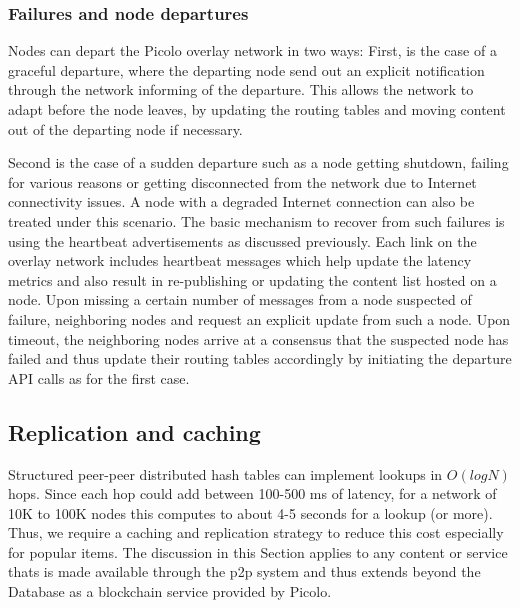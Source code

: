 \subsubsection{Failures and node departures}

Nodes can depart the Picolo overlay network in two ways: First, is the case of a graceful departure, where the departing
node send out an explicit notification through the network informing of the departure. This allows the network to adapt
before the node leaves, by updating the routing tables and moving content out of the departing node if necessary.

Second is the case of a sudden departure such as a node getting shutdown, failing for various reasons or getting
disconnected from the network due to Internet connectivity issues. A node with a degraded Internet connection can also
be treated under this scenario. The basic mechanism to recover from such failures is using the heartbeat advertisements
as discussed previously. Each link on the overlay network includes heartbeat messages which help update the latency
metrics and also result in re-publishing or updating the content list hosted on a node. Upon missing a certain number of
messages from a node suspected of failure, neighboring nodes and request an explicit update from such a node. Upon
timeout, the neighboring nodes arrive at a consensus that the suspected node has failed and thus update their routing
tables accordingly by initiating the departure API calls as for the first case.

\subsection{Replication and caching}
\label{net:replication}
Structured peer-peer distributed hash tables can implement lookups in \( O(log N)\) hops. Since each hop could add between 100-500
ms of latency, for a network of 10K to 100K nodes this computes to about 4-5 seconds for a lookup (or more). Thus, we
require a caching and replication strategy to reduce this cost especially for popular items. The discussion in this
Section applies to any content or service thats is made available through the p2p system and thus extends beyond the
Database as a blockchain service provided by Picolo.

